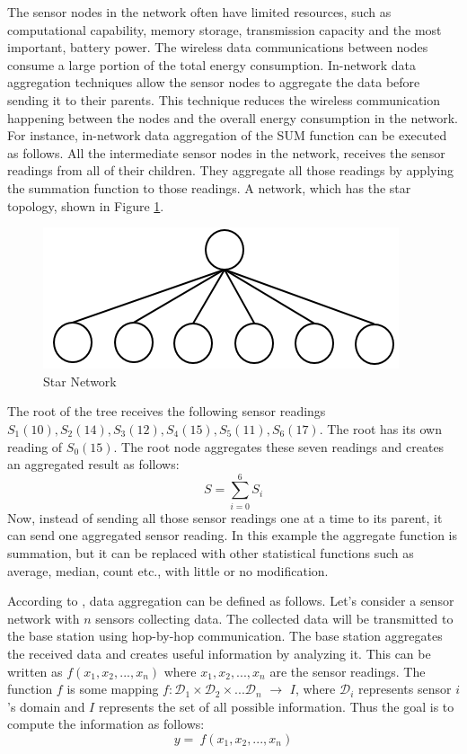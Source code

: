 	The sensor nodes in the network often have limited resources, such as computational capability, memory storage, transmission capacity and the most important, battery power.
	The wireless data communications between nodes consume a large portion of the total energy consumption. 
	In-network data aggregation techniques allow the sensor nodes to aggregate the data before sending it to their parents.
	This technique reduces the wireless communication happening between the nodes and the overall energy consumption in the network. 	
	For instance, in-network data aggregation of the SUM function can be executed as follows.
	All the intermediate sensor nodes in the network, receives the sensor readings from all of their children.
	They aggregate all those readings by applying the summation function to those readings.
	A network, which has the star topology, shown in Figure \ref{fig:star-network}.
	\begin{figure}[h!]
		\centering
		\includegraphics[scale = 1]{images/star-tree.png}
		\caption{Star Network}
		\label{fig:star-network}
	\end{figure}
	The root of the tree receives the following sensor readings $S_{1}(10),S_{2}(14),S_{3}(12),S_{4}(15),S_{5}(11),S_{6}(17)$.
	The root has its own reading of $S_{0}(15)$. 
	The root node aggregates these seven readings and creates an aggregated result as follows:
	\begin{equation}
		S = \sum_{i=0}^6 S_{i}
	\end{equation}
	Now, instead of sending all those sensor readings one at a time to its parent, it can send one aggregated sensor reading.
	In this example the aggregate function is summation, but it can be replaced with other statistical functions such as average, median, count etc., with little or no modification.

	According to \cite{zareafifi2012secure}, data aggregation can be defined as follows.
	Let's consider a sensor network with $n$ sensors collecting data.
	The collected data will be transmitted to the base station using hop-by-hop communication.
	The base station aggregates the received data and creates useful information by analyzing it. 
	This can be written as
		$f(x_{1}, x_{2},...,x_{n})$
	where $x_{1}, x_{2},..., x_{n}$ are the sensor readings.
	The function $f$ is some mapping $f: \mathcal{D}_{1} \times \mathcal{D}_{2} \times ... \mathcal{D}_{n}$ $\rightarrow$ $I$, where $\mathcal{D}_{i}$ represents sensor $i$'s domain and $I$ represents the set of all possible information. 
	Thus the goal is to compute the information as follows:
	\begin{equation}
		\label{eq:aggregation}
		y =\ f(x_{1}, x_{2},...,x_{n})
	\end{equation}

